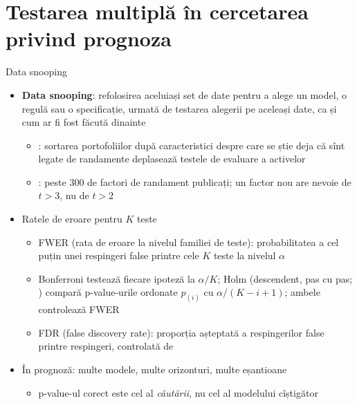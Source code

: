 \section{Testarea multiplă în cercetarea privind prognoza}

\begin{frame}{Data snooping}
\itemsize{\footnotesize}
\begin{itemize}
    \item \textbf{Data snooping}: refolosirea aceluiași set de date pentru a alege un model, o regulă sau o specificație, urmată de testarea alegerii pe aceleași date, ca și cum ar fi fost făcută dinainte
    \begin{itemize}
        \item {}: sortarea portofoliilor după caracteristici despre care se știe deja că sînt legate de randamente deplasează testele de evaluare a activelor
        \item {}: peste 300 de factori de randament publicați; un factor nou are nevoie de $t > 3$, nu de $t > 2$
    \end{itemize}
    \item Ratele de eroare pentru $K$ teste
    \begin{itemize}
        \item FWER (rata de eroare la nivelul familiei de teste): probabilitatea a cel puțin unei respingeri false printre cele $K$ teste la nivelul $\alpha$
        \item Bonferroni testează fiecare ipoteză la $\alpha/K$; Holm (descendent, pas cu pas; ) compară p-value-urile ordonate $p_{(i)}$ cu $\alpha/(K - i + 1)$; ambele controlează FWER
        \item FDR (false discovery rate): proporția așteptată a respingerilor false printre respingeri, controlată de 
    \end{itemize}
    \item În prognoză: multe modele, multe orizonturi, multe eșantioane
    \begin{itemize}
        \item p-value-ul corect este cel al \emph{căutării}, nu cel al modelului cîștigător
    \end{itemize}
\end{itemize}
\end{frame}

